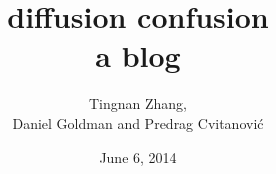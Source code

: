 \documentclass[10pt,openany]{book}
\begin{document}
        \date{June 6, 2014} \Private{\date{\today}}

\title{ 			diffusion confusion
       \\ \Huge 	a blog
        \\\vspace{1.0cm}
        }\author{
		Tingnan Zhang,
		\\
        Daniel Goldman
         and
        Predrag Cvitanovi\'{c}
        }

%
\maketitle

\thispagestyle{empty}
\tableofcontents



\newpage
\printbibliography[title={References}] %
%




\end{document}
